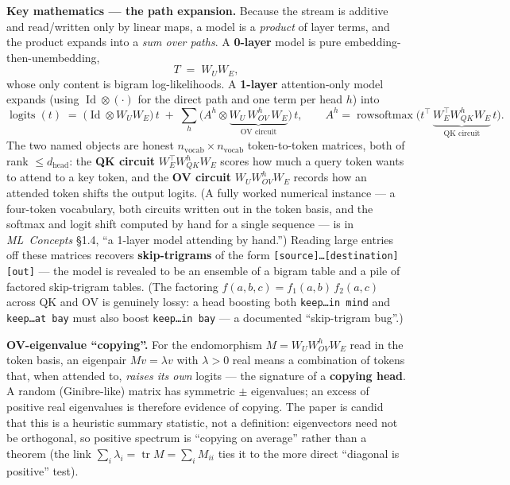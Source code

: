 \textbf{Key mathematics --- the path expansion.} Because the stream is additive and read/written only by linear maps, a model is a \emph{product} of layer terms, and the product expands into a \emph{sum over paths}. A \textbf{0-layer} model is pure embedding-then-unembedding,
\[
T \;=\; W_U W_E,
\]
whose only content is bigram log-likelihoods. A \textbf{1-layer} attention-only model expands (using $\operatorname{Id}\otimes(\cdot)$ for the direct path and one term per head $h$) into
\[
\operatorname{logits}(t) \;=\; \big(\operatorname{Id}\otimes W_U W_E\big)\,t \;+\; \sum_{h}\Big(A^{h}\otimes \underbrace{W_U\,W_{OV}^{h}\,W_E}_{\text{OV circuit}}\Big)\,t,
\qquad
A^{h} = \operatorname{rowsoftmax}\!\Big(t^{\top}\,\underbrace{W_E^{\top}W_{QK}^{h}W_E}_{\text{QK circuit}}\,t\Big).
\]
The two named objects are honest $n_{\mathrm{vocab}}\times n_{\mathrm{vocab}}$ token-to-token matrices, both of rank $\le d_{\mathrm{head}}$: the \textbf{QK circuit} $W_E^{\top}W_{QK}^{h}W_E$ scores how much a query token wants to attend to a key token, and the \textbf{OV circuit} $W_U W_{OV}^{h}W_E$ records how an attended token shifts the output logits. (A fully worked numerical instance --- a four-token vocabulary, both circuits written out in the token basis, and the softmax and logit shift computed by hand for a single sequence --- is in \emph{ML~Concepts} §1.4, ``a 1-layer model attending by hand.'') Reading large entries off these matrices recovers \textbf{skip-trigrams} of the form \texttt{[source]\dots[destination][out]} --- the model is revealed to be an ensemble of a bigram table and a pile of factored skip-trigram tables. (The factoring $f(a,b,c)=f_1(a,b)\,f_2(a,c)$ across QK and OV is genuinely lossy: a head boosting both \texttt{keep\dots in mind} and \texttt{keep\dots at bay} must also boost \texttt{keep\dots in bay} --- a documented ``skip-trigram bug''.)

\textbf{OV-eigenvalue ``copying''.} For the endomorphism $M = W_U W_{OV}^{h}W_E$ read in the token basis, an eigenpair $Mv=\lambda v$ with $\lambda>0$ real means a combination of tokens that, when attended to, \emph{raises its own} logits --- the signature of a \textbf{copying head}. A random (Ginibre-like) matrix has symmetric $\pm$ eigenvalues; an excess of positive real eigenvalues is therefore evidence of copying. The paper is candid that this is a heuristic summary statistic, not a definition: eigenvectors need not be orthogonal, so positive spectrum is ``copying on average'' rather than a theorem (the link $\sum_i\lambda_i = \operatorname{tr} M = \sum_i M_{ii}$ ties it to the more direct ``diagonal is positive'' test).

